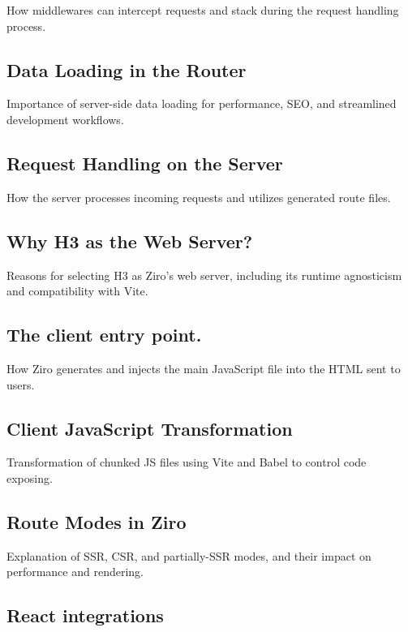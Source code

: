 How middlewares can intercept requests and stack during the request handling process.

\subsection{Data Loading in the Router}

Importance of server-side data loading for performance, SEO, and streamlined development workflows.

\subsection{Request Handling on the Server}

How the server processes incoming requests and utilizes generated route files.

\subsection{Why H3 as the Web Server?}

Reasons for selecting H3 as Ziro's web server, including its runtime agnosticism and compatibility with Vite.

\subsection{The client entry point.}

How Ziro generates and injects the main JavaScript file into the HTML sent to users.

\subsection{Client JavaScript  Transformation}

Transformation of chunked JS files using Vite and Babel to control code exposing.

\subsection{Route Modes in Ziro}

Explanation of SSR, CSR, and partially-SSR modes, and their impact on performance and rendering.

\subsection{React integrations}

